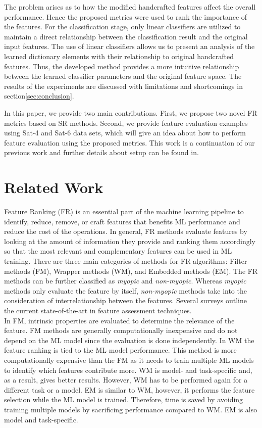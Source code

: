 The problem arises as to how the modified handcrafted features affect the overall performance. Hence the proposed metrics were used to rank the importance of the features. For the classification stage, only linear classifiers are utilized to maintain a direct relationship between the classification result and the original input features. The use of linear classifiers allows us to present an analysis of the learned dictionary elements with their relationship to original handcrafted features. Thus, the developed method provides a more intuitive relationship between the learned classifier parameters and the original feature space. The results of the experiments are discussed with limitations and shortcomings in section\ref{sec:conclusion}. 

In this paper, we provide two main contributions. First, we propose two novel FR metrics based on SR methods. Second, we provide feature evaluation examples using Sat-4 and Sat-6 data sets, which will give an idea about how to perform feature evaluation using the proposed metrics. This work is a continuation of our previous work and further details about setup can be found in\cite{Liyanage2020}. 

\section{Related Work}\label{sec:relatedwork}

Feature Ranking (FR) is an essential part of the machine learning pipeline to identify, reduce, remove, or craft features that benefits ML performance and reduce the cost of the operations. In general, FR methods evaluate features by looking at the amount of information they provide and ranking them accordingly so that the most relevant and complementary features can be used in ML training. There are three main categories of methods for FR algorithms: Filter methods (FM), Wrapper methods (WM), and Embedded methods (EM). The FR methods can be further classified as \emph{myopic} and \emph{non-myopic}. Whereas \emph{myopic} methods only evaluate the feature by itself, \emph{non-myopic} methods take into the consideration of interrelationship between the features. Several surveys outline the current state-of-the-art in feature assessment techniques\cite{Uthman2020, Sangodiah2014, Effrosynidis2021, Jovic2015}.\\ 

In FM, intrinsic properties are evaluated to determine the relevance of the feature. FM methods are generally computationally inexpensive and do not depend on the ML model since the evaluation is done independently. In WM the feature ranking is tied to the ML model performance. This method is more computationally expensive than the FM as it needs to train multiple ML models to identify which features contribute more. WM is model- and task-specific and, as a result, gives better results. However, WM has to be performed again for a different task or a model. EM is similar to WM, however, it performs the feature selection while the ML model is trained. Therefore, time is saved by avoiding training multiple models by sacrificing performance compared to WM. EM is also model and task-specific.  


